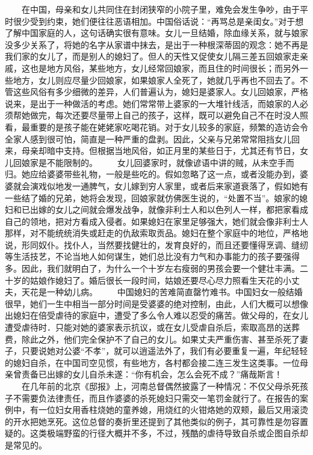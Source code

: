 \documentclass[12pt,oneside]{book}
\begin{document}
\begin{common-format}
　　在中国，母亲和女儿共同住在封闭狭窄的小院子里，难免会发生争吵，由于平时很少受到约束，她们便往往恶语相加。中国俗话说：“再骂总是亲闺女。”对于想了解中国家庭的人，这句话确实很有意味。女儿一旦结婚，除血缘关系，就与娘家没多少关系了，将她的名字从家谱中抹去，是出于一种根深蒂固的观念：她不再是我们家的女儿了，而是别人的媳妇了。但人的天性又促使女儿隔三差五回娘家走亲戚，这也是地方风俗，某些地方，女儿经常回娘家，而且住的时间很长；而另外一些地方，女儿则应尽量少回娘家，如果娘家人全死了，她就几乎再也不回去了。不管这些风俗有多少细微的差异，人们普遍认为，媳妇是婆家人。女儿回娘家，严格说来，是出于一种做活的考虑。她们常常带上婆家的一大堆针线活，而娘家的人必须帮她做完，每次还要尽量带上自己的孩子，这样，既可以避免自己不在时没人照看，最重要的是孩子能在姥姥家吃喝花销。对于女儿较多的家庭，频繁的造访会令全家人感到很可怕，简直是一种严重的盘剥。因此，父亲与兄弟常常阻挡女儿回来，母亲却暗中支持。但根据当地风俗，如正月里的某些日于，尤其还有节日，女儿回娘家是不能限制的。 
　　女儿回婆家时，就像谚语中讲的贼，从未空手而归。她应给婆婆带些礼物，一般是些吃的。假如忽略了这一点，或者没能办到，婆婆就会演戏似地发一通脾气，女儿嫁到穷人家里，或者后来家道衰落了，假如她有一些结了婚的兄弟，她将会发现，回娘家就仿佛医生说的，“处置不当”。娘家的媳妇和已出嫁的女儿之间就会爆发战争，就像非利士人和以色列人一样，都把家看成自己的领地，把对方看成入侵者。如果媳妇在家里足够强大，她们就会像非利士人那样，对不能统统消失或赶走的仇敌索取贡品。媳妇在整个家庭中的地位，严格地说，形同奴仆。找仆人，当然要找健壮的，发育良好的，而且还要懂得烹调、缝纫等生活技艺，不论当地人如何谋生，她们总比没有力气和办事能力的孩子要强得多。因此，我们就明白了，为什么一个十岁左右瘦弱的男孩会要一个健壮丰满。二十岁的姑娘作媳妇了。婚后很长一段时间，姑娘还要尽心尽力照看生天花的小丈夫，天花是一种幼儿病。 
　　中国媳妇的苦难简直罄竹难书。中国妇女一般结婚很早，她们一生中相当一部分时间是受婆婆的绝对控制，由此，人们大概可以想像出媳妇在倍受虐待的家庭中，遭受了多么令人难以忍受的痛苦。做父母的，在女儿遭受虐待时．只能对她的婆家表示抗议，或在女儿受虐自杀后，索取高昂的送葬费，除此之外，他们完全保护不了自己的女儿。如果丈夫严重伤害、甚至杀死了妻子，只要说她对公婆“不孝”，就可以逍遥法外了，我们有必要重复一遍，年纪轻轻的媳妇自杀，在中国司空见惯，有些地方，各村都会接二连三发生这类事。一位母亲曾责备已出嫁的女儿自杀未遂：“你有机会，怎么会死不成？”痛哉斯言！ 
　　在几年前的北京《邸报》上，河南总督偶然披露了一种情况：不仅父母杀死孩子不需要负法律责任，而且作婆婆的杀死媳妇只需交一笔罚金就行了。在报告的案例中，有一位妇女用香柱烧她的童养媳，用烧红的火钳烙她的双颊，最后又用滚烫的开水把她烹死。这位总督的奏折里还提到了其他类似的例子，其可靠性是勿容置疑的。这类极端野蛮的行径大概并不多，不过，残酷的虐待导致自杀或企图自杀却是常见的。 

\end{common-format}
\end{document}

